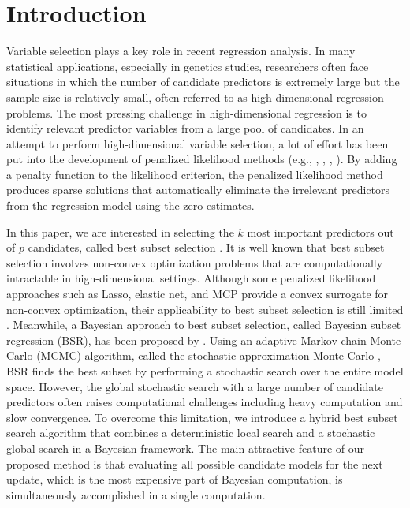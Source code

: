 \documentclass[twocolumn]{svjour3}       %
\newcommand{\0}{\boldsymbol 0} %
\newcommand{\1}{\boldsymbol 1} %
\begin{document}
\section{Introduction}\label{sec:1}
Variable selection plays a key role in recent regression analysis. In many statistical applications, especially in genetics studies, researchers often face situations in which the number of candidate predictors is extremely large but the sample size is relatively small, often referred to as high-dimensional regression problems. The most pressing challenge in high-dimensional regression is to identify relevant predictor variables from a large pool of candidates. In an attempt to perform high-dimensional variable selection, a lot of effort has been put into the development of penalized likelihood methods (e.g., \cite{tibshirani1996regression}, \cite{fan2001variable}, \cite{zou2005regularization}, \cite{zhang2010nearly}). By adding a penalty function to the likelihood criterion, the penalized likelihood method produces sparse solutions that automatically eliminate the irrelevant predictors from the regression model using the zero-estimates.



In this paper, we are interested in selecting the $k$ most important predictors out of $p$ candidates, called best subset selection \cite{hocking1967selection}. It is well known that best subset selection involves non-convex optimization problems that are computationally intractable in high-dimensional settings. Although some penalized likelihood approaches such as Lasso, elastic net, and MCP provide a convex surrogate for non-convex optimization, their applicability to best subset selection is still limited \cite{bertsimas2016best}. Meanwhile, a Bayesian approach to best subset selection, called Bayesian subset regression (BSR), has been proposed by \cite{liang:2013bayesian}. Using an adaptive Markov chain Monte Carlo (MCMC) algorithm, called the stochastic approximation Monte Carlo \cite{liang2007stochastic}, BSR finds the best subset by performing a stochastic search over the entire model space. However, the global stochastic search with a large number of candidate predictors often raises computational challenges including heavy computation and slow convergence. To overcome this limitation, we introduce a hybrid best subset search algorithm that combines a deterministic local search and a stochastic global search in a Bayesian framework. The main attractive feature of our proposed method is that evaluating all possible candidate models for the next update, which is the most expensive part of Bayesian computation, is simultaneously accomplished in a single computation.
\end{document}
